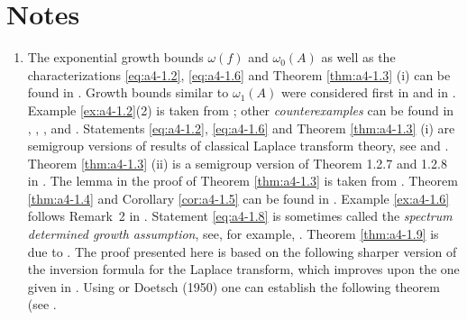 \section*{Notes}
\begin{enumerate}[%
label={\Large \emph{Section \arabic*:}}
, wide
, labelindent = 0.0em]

\item 
The exponential growth bounds $\omega(f)$ and $\omega_0(A)$ as well as the characterizations \eqref{eq:a4-1.2}, \eqref{eq:a4-1.6} and Theorem \ref{thm:a4-1.3} (i) can be found in \citet{hillephillips:1957}.
Growth bounds similar to $\omega_{1}(A)$ were considered first in \citet{djacenko:1976} and in \citet[Prop.2]{zabczyk:1979}. 
Example \ref{ex:a4-1.2}(2) is taken from \citet{wolff:1981}; other \emph{counterexamples} can be found in \citet{hillephillips:1957}, \citet{foias:1973}, \citet{triggiani:1975}, 
\citet{zabczyk:1975} and \citet{greineretal:1981}. 
Statements \eqref{eq:a4-1.2}, \eqref{eq:a4-1.6} and Theorem \ref{thm:a4-1.3} (i) are semigroup versions of results of classical Laplace transform theory, see \citet{hillephillips:1957} and \citet{widder:1946}. 
Theorem \ref{thm:a4-1.3} (ii) is a semigroup version of Theorem 1.2.7 and 1.2.8 in \citet{doetsch:1950}. 
The lemma in the proof of Theorem \ref{thm:a4-1.3} is taken from \citet{milstein:1975}. 
Theorem \ref{thm:a4-1.4} and Corollary \ref{cor:a4-1.5} can be found in \citet{neubrander:1985a}. 
Example \ref{ex:a4-1.6} follows Remark~2 in \citet{zabczyk:1975}. 
Statement \eqref{eq:a4-1.8} is sometimes called the \emph{spectrum determined growth assumption}, see, for example, \citet{triggiani:1975b}. 
Theorem \ref{thm:a4-1.9} is due to \citet{slemrod:1976}. 
The proof presented here is based on the following sharper version of the inversion formula for the Laplace transform, which improves upon the one given in \citet[p.349]{hillephillips:1957}. 
Using \citet[p.66]{widder:1946} or \citet[p.212]{doetsch:1950}Doetsch (1950) one can establish the following theorem (see \citet{neubrander:1984b}.


\end{enumerate}

